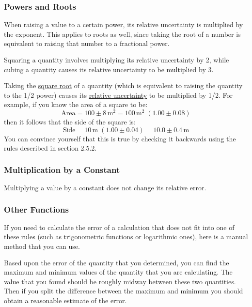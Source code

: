 \documentclass{article}
\begin{document}
\subsubsection{Powers and Roots}

When raising a value to a certain power, its relative uncertainty is multiplied by the exponent. This applies to roots as well, since taking the root of a number is equivalent to raising that number to a fractional power.\myskip 

Squaring a quantity involves multiplying its relative uncertainty by 2, while cubing a quantity causes its relative uncertainty to be multiplied by 3.\myskip

Taking the \underline{square root} of a quantity (which is equivalent to raising the quantity to the 1/2 power) causes its \underline{relative uncertainty} to be multiplied by 1/2. For example, if you know the area of a square to be: 
\begin{equation}
    \text{Area} = 100\pm 8\,\mathrm{m^2} = 100\,\mathrm{m}^2\;(1.00\pm 0.08)
\end{equation}
then it follows that the side of the square is:
\begin{equation}
    \text{Side} = 10\,\mathrm{m}\;\left( 1.00\pm 0.04 \right) = 10.0\pm 0.4\,\mathrm{m}
\end{equation}
You can convince yourself that this is true by checking it backwards using the rules described in section 2.5.2.

\subsubsection{Multiplication by a Constant}

Multiplying a value by a constant does not change its relative error.

\subsubsection{Other Functions}

If you need to calculate the error of a calculation that does not fit into one of these rules (such as trigonometric functions or logarithmic ones), here is a manual method that you can use.\myskip

Based upon the error of the quantity that you determined, you can find the maximum and minimum values of the quantity that you are calculating. The value that you found should be roughly midway between these two quantities. Then if you split the difference between the maximum and minimum you should obtain a reasonable estimate of the error.\myskip
\end{document}
